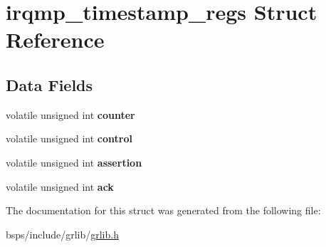 \hypertarget{structirqmp__timestamp__regs}{}\section{irqmp\+\_\+timestamp\+\_\+regs Struct Reference}
\label{structirqmp__timestamp__regs}
\subsection*{Data Fields}
\begin{DoxyCompactItemize}
\item 
\mbox{\label{structirqmp__timestamp__regs_a7db1148fb435aa4777f0541dc21a3fc0}} 
volatile unsigned int {\bfseries counter}
\item 
\mbox{\label{structirqmp__timestamp__regs_a002ee7b27402f538a2400b4aef2389c1}} 
volatile unsigned int {\bfseries control}
\item 
\mbox{\label{structirqmp__timestamp__regs_a1e99e365d769d1a17b8c5ff34f51bb6a}} 
volatile unsigned int {\bfseries assertion}
\item 
\mbox{\label{structirqmp__timestamp__regs_a42d1f8fa21c220cf6e77331861eaf2d2}} 
volatile unsigned int {\bfseries ack}
\end{DoxyCompactItemize}


The documentation for this struct was generated from the following file\+:\begin{DoxyCompactItemize}
\item 
bsps/include/grlib/\mbox{\hyperlink{grlib_8h}{grlib.\+h}}\end{DoxyCompactItemize}
